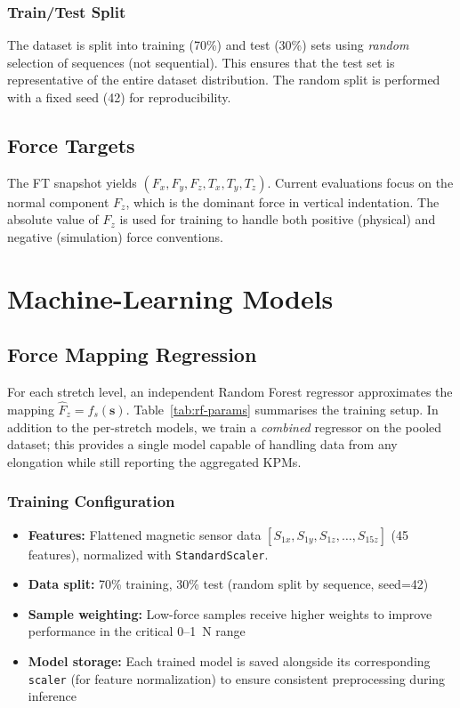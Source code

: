 \documentclass[11pt,a4paper]{article}
\begin{document}
\subsubsection{Train/Test Split}
The dataset is split into training (70\%) and test (30\%) sets using \emph{random} selection of sequences (not sequential). This ensures that the test set is representative of the entire dataset distribution. The random split is performed with a fixed seed (42) for reproducibility.

\subsection{Force Targets}
The FT snapshot yields \((F_x, F_y, F_z, T_x, T_y, T_z)\). Current evaluations focus on the
normal component \(F_z\), which is the dominant force in vertical indentation. The absolute value of \(F_z\) is used for training to handle both positive (physical) and negative (simulation) force conventions.

\section{Machine-Learning Models}

\subsection{Force Mapping Regression}
For each stretch level, an independent Random Forest regressor approximates the mapping
\(\hat{F}_z = f_s(\mathbf{s})\). Table~\ref{tab:rf-params} summarises the training setup. In addition
to the per-stretch models, we train a \emph{combined} regressor on the pooled dataset; this provides
a single model capable of handling data from any elongation while still reporting the aggregated
KPMs.

\subsubsection{Training Configuration}
\begin{itemize}[leftmargin=1.5em]
    \item \textbf{Features:} Flattened magnetic sensor data \([S_{1x}, S_{1y}, S_{1z}, \ldots, S_{15z}]\) (45 features), normalized with \texttt{StandardScaler}.
    \item \textbf{Data split:} 70\% training, 30\% test (random split by sequence, seed=42)
    \item \textbf{Sample weighting:} Low-force samples receive higher weights to improve performance in the critical 0--1~N range
    \item \textbf{Model storage:} Each trained model is saved alongside its corresponding \texttt{scaler} (for feature normalization) to ensure consistent preprocessing during inference
\end{itemize}
\end{document}

